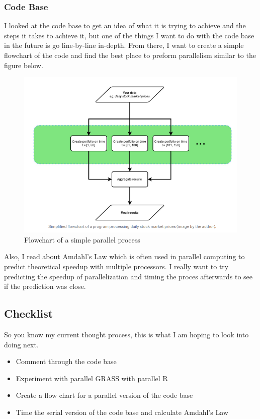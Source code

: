 \documentclass[a4paper,10pt]{article}
\begin{document}
\subsubsection{Code Base}
I looked at the code base to get an idea of what it is trying to achieve and the steps it takes to achieve it, but one of the things I 
want to do with the code base in the future is go line-by-line in-depth. From there, I want to create a simple flowchart of the code and 
find the best place to preform parallelism similar to the figure below.
\begin{figure}[h!]
    \caption{Flowchart of a simple parallel process \cite{gera2020}}
    \centering
    \includegraphics[scale=0.3]{flowchart.png}
\end{figure}

Also, I read about Amdahl's Law which is often used in parallel computing to predict theoretical speedup with multiple processors. \cite{hallquist2018}
I really want to try predicting the speedup of parallelization and timing the proces afterwards to see if the prediction was close.

\subsection{Checklist}
So you know my current thought process, this is what I am hoping to look into doing next.
\begin{itemize}
    \item Comment through the code base
    \item Experiment with parallel GRASS with parallel R
    \item Create a flow chart for a parallel version of the code base
    \item Time the serial version of the code base and calculate Amdahl's Law
\end{itemize}
\end{document}
